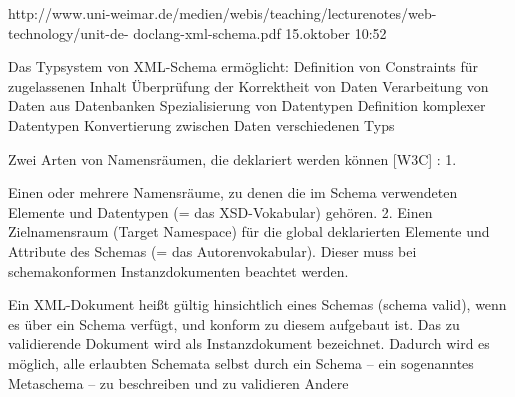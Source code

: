 
http://www.uni-weimar.de/medien/webis/teaching/lecturenotes/web-technology/unit-de-
doclang-xml-schema.pdf 15.oktober 10:52

Das Typsystem von XML-Schema ermöglicht: 
Definition von Constraints für zugelassenen Inhalt 
Überprüfung der Korrektheit von Daten 
Verarbeitung von Daten aus Datenbanken 
Spezialisierung von Datentypen 
Definition komplexer Datentypen 
Konvertierung zwischen Daten verschiedenen Typs

Zwei Arten von Namensräumen, die deklariert werden können [W3C] : 1.

Einen oder mehrere Namensräume, zu denen die im Schema verwendeten Elemente und Datentypen (= das XSD-Vokabular) gehören. 2. Einen Zielnamensraum (Target Namespace) für die global deklarierten Elemente und Attribute des Schemas (= das Autorenvokabular). Dieser muss bei schemakonformen Instanzdokumenten beachtet werden.

Ein XML-Dokument heißt gültig hinsichtlich eines Schemas (schema valid), wenn es über ein Schema verfügt, und konform zu diesem aufgebaut ist. Das zu validierende Dokument wird als Instanzdokument bezeichnet. Dadurch wird es möglich, alle erlaubten Schemata selbst durch ein Schema – ein sogenanntes Metaschema – zu beschreiben und zu validieren
Andere
